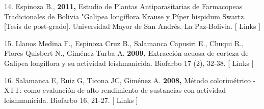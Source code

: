 \documentclass{article}
\begin{document}
14. Espinoza B., \textbf{2011, }
Estudio de Plantas Antiparasitarias de Farmacopeas Tradicionales de Bolivia
"Galipea longíflora Krause y Píper hispidum Swartz. [Tesis de post-grado].
Universidad Mayor de San Andrés. La Paz-Bolivia. [ Links ]

15. Llanos Medina F., Espinoza Cruz B., Salamanca Capusiri E., Chuqui R., Flores
Quisbert N., Giménez Turba A. \textbf{2009, }
Extracción acuosa de corteza de Galipea longiflora y su actividad leishmanicida.
Biofarbo 17 (2), 32-38. [ Links ]

16. Salamanca E, Ruiz G, Ticona JC, Giménez A. \textbf{2008, }
Método colorimétrico - XTT: como evaluación de alto rendimiento de sustancias
con actividad leishmanicida. Biofarbo 16, 21-27. [ Links ]
\end{document}
